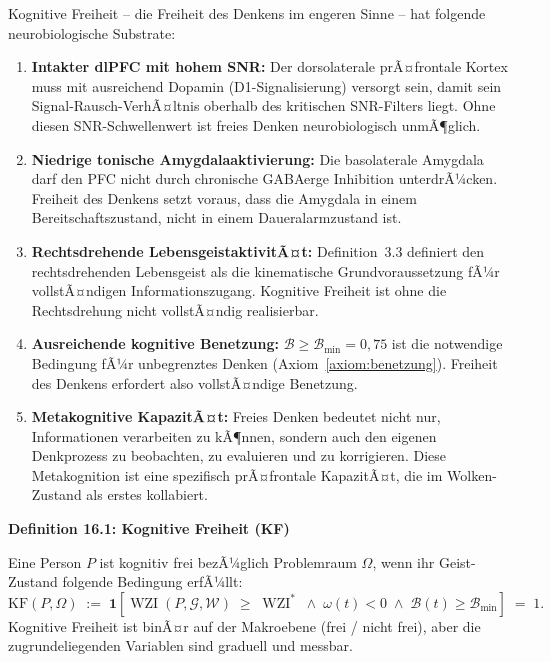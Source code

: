 ﻿\documentclass[12pt,a4paper]{report}
\theoremstyle{plain}
\theoremstyle{definition}
\theoremstyle{remark}
\DeclareMathOperator{\WZI}{WZI}
\begin{document}
	Kognitive Freiheit -- die Freiheit des Denkens im engeren Sinne --
	hat folgende neurobiologische Substrate:

	\begin{enumerate}[label=\textbf{(\arabic*)}, leftmargin=1.8cm]
		\item \textbf{Intakter dlPFC mit hohem SNR:}
		Der dorsolaterale prÃ¤frontale Kortex muss mit
		ausreichend Dopamin (D1-Signalisierung) versorgt sein,
		damit sein Signal-Rausch-VerhÃ¤ltnis oberhalb des kritischen
		SNR-Filters liegt. Ohne diesen SNR-Schwellenwert ist
		freies Denken neurobiologisch unmÃ¶glich.

		\item \textbf{Niedrige tonische Amygdalaaktivierung:}
		Die basolaterale Amygdala darf den PFC nicht durch chronische
		GABAerge Inhibition unterdrÃ¼cken. Freiheit des Denkens
		setzt voraus, dass die Amygdala in einem Bereitschaftszustand,
		nicht in einem Daueralarmzustand ist.

		\item \textbf{Rechtsdrehende LebensgeistaktivitÃ¤t:}
		Definition~3.3 definiert den rechtsdrehenden Lebensgeist
		als die kinematische Grundvoraussetzung fÃ¼r vollstÃ¤ndigen
		Informationszugang. Kognitive Freiheit ist ohne die
		Rechtsdrehung nicht vollstÃ¤ndig realisierbar.

		\item \textbf{Ausreichende kognitive Benetzung:}
		$\mathcal{B} \geq \mathcal{B}_{\min} = 0{,}75$ ist die
		notwendige Bedingung fÃ¼r unbegrenztes Denken
		(Axiom~\ref{axiom:benetzung}). Freiheit des Denkens
		erfordert also vollstÃ¤ndige Benetzung.

		\item \textbf{Metakognitive KapazitÃ¤t:}
		Freies Denken bedeutet nicht nur, Informationen verarbeiten
		zu kÃ¶nnen, sondern auch den eigenen Denkprozess zu beobachten,
		zu evaluieren und zu korrigieren. Diese Metakognition
		ist eine spezifisch prÃ¤frontale KapazitÃ¤t, die im Wolken-Zustand
		als erstes kollabiert.
	\end{enumerate}

	
	\noindent\textbf{Definition 16.1: Kognitive Freiheit (KF)}

		Eine Person $P$ ist kognitiv frei bezÃ¼glich Problemraum $\Omega$,
		wenn ihr Geist-Zustand folgende Bedingung erfÃ¼llt:
		\[
		\mathrm{KF}(P, \Omega)
		\;:=\;
		\mathbf{1}\!\left[
		\WZI(P, \mathcal{G}, \mathcal{W}) \;\geq\; \WZI^*
		\;\wedge\;
		\omega(t) < 0
		\;\wedge\;
		\mathcal{B}(t) \geq \mathcal{B}_{\min}
		\right]
		\;=\; 1.
		\]
		Kognitive Freiheit ist binÃ¤r auf der Makroebene
		(frei / nicht frei), aber die zugrundeliegenden Variablen
		sind graduell und messbar.
\end{document}
